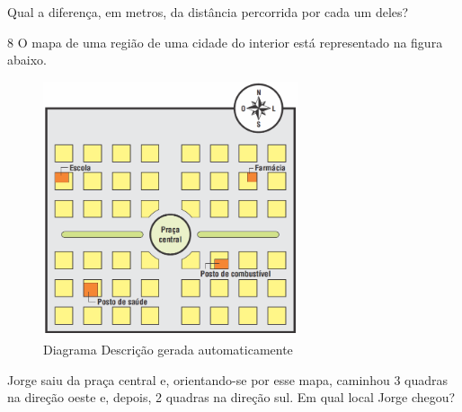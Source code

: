 \begin{escolha}
\begin{escolha}
\begin{escolha}
\begin{escolha}
{\begin{boxmedio}
\begin{boxpeq}
\begin{q°}
\begin{boxmedio}
\begin{boxpeq}
\begin{boxpeq}
\begin{boxmedio}
\begin{boxmedio}
\begin{boxmedio}
Qual a diferença, em metros, da distância percorrida por cada um deles?


\num{8} O mapa de uma região de uma cidade do interior está representado na
figura abaixo.

\begin{figure}
\centering
\includegraphics[width=2.96528in,height=2.96528in]{./_SAEB_9_MAT/media/image207.png}
\caption{Diagrama Descrição gerada automaticamente}
\end{figure}


Jorge saiu da praça central e, orientando-se por esse mapa, caminhou 3
quadras na direção oeste e, depois, 2 quadras na direção sul. Em qual
local Jorge chegou?



\end{boxmedio}
\end{boxmedio}
\end{boxmedio}
\end{boxpeq}
\end{boxpeq}
\end{boxmedio}
\end{q°}
\end{boxpeq}
\end{boxmedio}}
\end{escolha}
\end{escolha}
\end{escolha}
\end{escolha}
